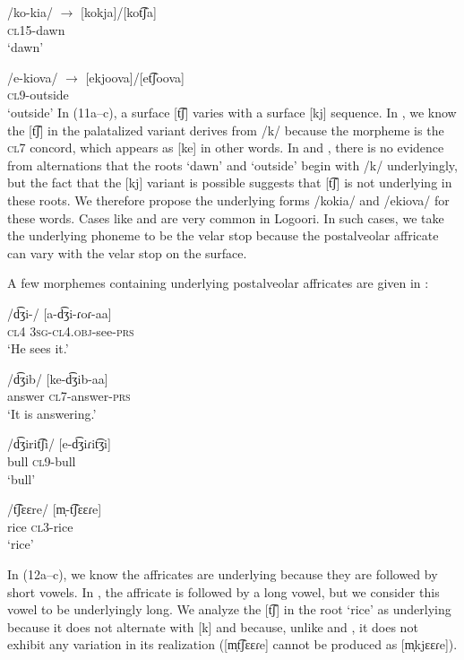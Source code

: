 \documentclass[output=paper]{langsci/langscibook}
\begin{document}
\ex\label{ex:glewwe:11b}{}
 /ko-kia/    $\rightarrow$  [kokja]/[kot͡ʃa]\\{}
\textsc{cl15}-dawn\\{}
\glt ‘dawn’

\ex\label{ex:glewwe:11c}{}
 /e-kiova/  $\rightarrow$  [ekjoova]/[et͡ʃoova]\\{}
\textsc{cl9}-outside\\{}
\glt ‘outside’
\z
\z 
In (11a–c), a surface [t͡ʃ] varies with a surface [kj] sequence. In , we know the [t͡ʃ] in the palatalized variant derives from /k/ because the morpheme is the \textsc{cl}7 concord, which appears as [ke] in other words. In  and , there is no evidence from alternations that the roots ‘dawn’ and ‘outside’ begin with /k/ underlyingly, but the fact that the [kj] variant is possible suggests that [t͡ʃ] is not underlying in these roots. We therefore propose the underlying forms /kokia/ and /ekiova/ for these words. Cases like  and  are very common in Logoori. In such cases, we take the underlying phoneme to be the velar stop because the postalveolar affricate can vary with the velar stop on the surface. 

A few morphemes containing underlying postalveolar affricates are given in :

\ea\label{ex:glewwe:12}{}
  \ea\label{ex:glewwe:12a}
  \gll /d͡ʒi-/  [a-d͡ʒi-ɾoɾ-aa]\\
  \textsc{cl}4  3\textsc{sg}-\textsc{cl}4.\textsc{obj}-see-\textsc{prs}\\
  \glt ‘He sees it.’

  \ex\label{ex:glewwe:12b}{}
  \gll /d͡ʒib/  [ke-d͡ʒib-aa]\\
  answer  \textsc{cl7}-answer-\textsc{prs}\\
  \glt ‘It is answering.’

  \ex\label{ex:glewwe:12c}{}
  \gll /d͡ʒirit͡ʃi/  [e-d͡ʒiɾit͡ʒi]\\
  bull  \textsc{cl9}-bull\\
   \glt   ‘bull’

  \ex\label{ex:glewwe:12d}{}
  \gll /t͡ʃɛɛre/  [m̩-t͡ʃɛɛɾe]\\
  rice  \textsc{cl3}-rice\\
  \glt    ‘rice’
  \z
\z 


In (12a–c), we know the affricates are underlying because they are followed by short vowels. In , the affricate is followed by a long vowel, but we consider this vowel to be underlyingly long. We analyze the [t͡ʃ] in the root ‘rice’ as underlying because it does not alternate with [k] and because, unlike  and , it does not exhibit any variation in its realization ([m̩t͡ʃɛɛɾe] cannot be produced as [m̩kjɛɛɾe]).
\end{document}
